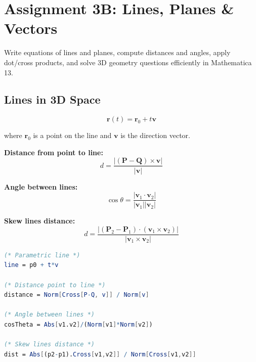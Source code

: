\documentclass[12pt,a4paper]{article}
\begin{document}
\section{Assignment 3B: Lines, Planes \& Vectors}

\begin{definitionbox}
    Write equations of lines and planes, compute distances and angles, apply dot/cross products,
    and solve 3D geometry questions efficiently in Mathematica 13.
\end{definitionbox}

\subsection{Lines in 3D Space}

\begin{definitionbox}
    \[ \mathbf{r}(t) = \mathbf{r}_0 + t\mathbf{v} \]
    
    where \(\mathbf{r}_0\) is a point on the line and \(\mathbf{v}\) is the direction vector.
\end{definitionbox}

\begin{formulabox}
    \textbf{Distance from point to line:}
    \[ d = \frac{|(\mathbf{P} - \mathbf{Q}) \times \mathbf{v}|}{|\mathbf{v}|} \]
    
    \textbf{Angle between lines:}
    \[ \cos\theta = \frac{|\mathbf{v}_1 \cdot \mathbf{v}_2|}{|\mathbf{v}_1||\mathbf{v}_2|} \]
    
    \textbf{Skew lines distance:}
    \[ d = \frac{|(\mathbf{P}_2 - \mathbf{P}_1) \cdot (\mathbf{v}_1 \times \mathbf{v}_2)|}{|\mathbf{v}_1 \times \mathbf{v}_2|} \]
\end{formulabox}

\begin{mathematicabox}
    \begin{lstlisting}[language=Mathematica, basicstyle=\ttfamily\small]
(* Parametric line *)
line = p0 + t*v

(* Distance point to line *)
distance = Norm[Cross[P-Q, v]] / Norm[v]

(* Angle between lines *)
cosTheta = Abs[v1.v2]/(Norm[v1]*Norm[v2])

(* Skew lines distance *)
dist = Abs[(p2-p1).Cross[v1,v2]] / Norm[Cross[v1,v2]]
    \end{lstlisting}
\end{mathematicabox}
\end{document}
